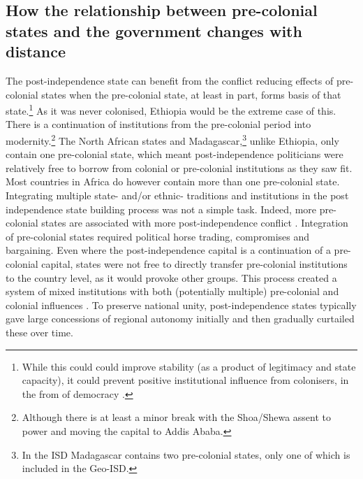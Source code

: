 \documentclass[12pt]{article}
\begin{document}
\subsection{How the relationship between pre-colonial states and the government
changes with distance}
\label{How the relationship between pre-colonial states and the government
changes with distance}

The post-independence state can benefit from the conflict reducing effects of
pre-colonial states when the pre-colonial state, at least in part, forms basis
of that state.\footnote{While this could could improve stability (as a product
	of legitimacy and state capacity), it could prevent positive
institutional influence from colonisers, in the from of democracy
\citep{Hariri2012, Woodberry2012}.} As it was never colonised, Ethiopia would be
the extreme case of this. There is a continuation of institutions from the
pre-colonial period into modernity.\footnote{Although there is at least a minor
break with the Shoa/Shewa assent to power and moving the capital to Addis
Ababa.} The North African states and Madagascar,\footnote{In the ISD Madagascar
contains two pre-colonial states, only one of which is included in the Geo-ISD.}
unlike Ethiopia, only contain one pre-colonial state, which meant
post-independence politicians were relatively free to borrow from colonial or
pre-colonial institutions as they saw fit. Most countries in Africa do however
contain more than one pre-colonial state. Integrating multiple state- and/or
ethnic- traditions and institutions in the post independence state building
process was not a simple task. Indeed, more pre-colonial states are associated
with more post-independence conflict \citep{Wishman_2022}. Integration of
pre-colonial states required political horse trading, compromises and
bargaining. Even where the post-independence capital is a continuation of a
pre-colonial capital, states were not free to directly transfer pre-colonial
institutions to the country level, as it would provoke other groups. This
process created a system of mixed institutions with both (potentially multiple)
pre-colonial and colonial influences \citep{englebert2013inside}. To preserve
national unity, post-independence states typically gave large concessions of
regional autonomy initially and then gradually curtailed these over time.
\end{document}
